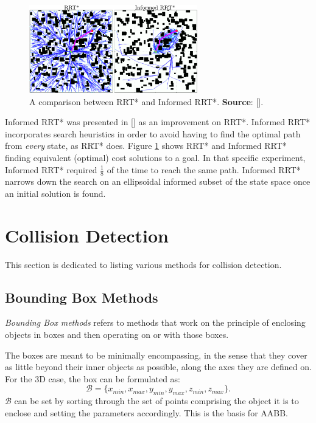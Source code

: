 \begin{figure}[h]
	\centering
	\includegraphics[width=0.65\textwidth]{import/RRT_starvsinformed.png}
	\caption{A comparison between RRT* and Informed RRT*. \textbf{Source}: [\citeauthor{Gammell2014}].}
	\label{fig:RRT_optimal_comp}
\end{figure}

Informed \gls{RRT}* was presented in [\citeauthor{Gammell2014}] as an improvement on \gls{RRT}*. Informed \gls{RRT}* incorporates search heuristics in order to avoid having to find the optimal path from \textit{every} state, as \gls{RRT}* does. Figure \ref{fig:RRT_optimal_comp} shows \gls{RRT}* and Informed \gls{RRT}* finding equivalent (optimal) cost solutions to a goal. In that specific experiment, Informed \gls{RRT}* required $\frac{1}{8}$ of the time to reach the same path. Informed \gls{RRT}* narrows down the search on an ellipsoidal informed subset of the state space once an initial solution is found.

\section{Collision Detection}\label{sec:ColliD}

This section is dedicated to listing various methods for collision detection.

\subsection{Bounding Box Methods} \label{subsec:BBM}

\textit{Bounding Box methods} refers to methods that work on the principle of enclosing objects in boxes and then operating on or with those boxes. 

The boxes are meant to be minimally encompassing, in the sense that they cover as little beyond their inner objects as possible, along the axes they are defined on. For the 3D case, the box can be formulated as:
\begin{equation}
\mathcal{B} = \{x_{min}, x_{max}, y_{min}, y_{max}, z_{min}, z_{max}\}.
\end{equation}
$\mathcal{B}$ can be set by sorting through the set of points comprising the object it is to enclose and setting the parameters accordingly. This is the basis for \gls{AABB}.

